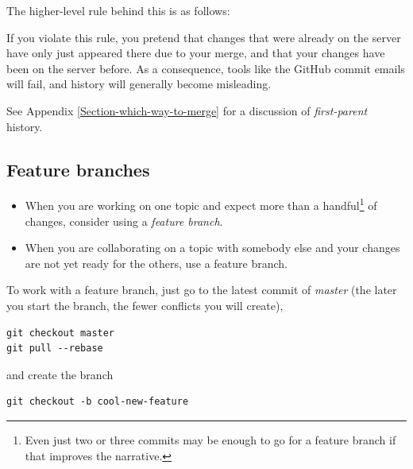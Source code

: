 \documentclass[12pt,pdftex]{article}
\begin{document}
\bigskip

The higher-level rule behind this is as follows:
\begin{quote}
\setlength{\fboxsep}{8pt}
\end{quote}

If you violate this rule, you pretend that changes that were already on
the server have only just appeared there due to your merge, and that
your changes have been on the server before.
As a consequence, tools like the GitHub
commit emails will fail,
and history will generally become misleading.

See Appendix \ref{Section-which-way-to-merge} for a discussion of
\emph{first-parent} history.


\subsection{Feature branches}
\label{sec-5-2}

\begin{itemize}
\item When you are working on one topic and expect more than a
handful\footnote{Even just two or three commits may be enough to go for a feature
branch if that improves the narrative.} of changes, consider using a \emph{feature branch}.

\item When you are collaborating on a topic with somebody else and your
changes are not yet ready for the others, use a feature branch.
\end{itemize}


To work with a feature branch, just go to the latest commit of \emph{master}
(the later you start the branch, the fewer conflicts you will create),

\lstset{frame=single,basicstyle=\ttfamily\footnotesize,language=sh,label= ,caption= ,captionpos=b,numbers=none}
\begin{lstlisting}
git checkout master
git pull --rebase
\end{lstlisting}
and create the branch
\lstset{frame=single,basicstyle=\ttfamily\footnotesize,language=sh,label= ,caption= ,captionpos=b,numbers=none}
\begin{lstlisting}
git checkout -b cool-new-feature
\end{lstlisting}
\end{document}
